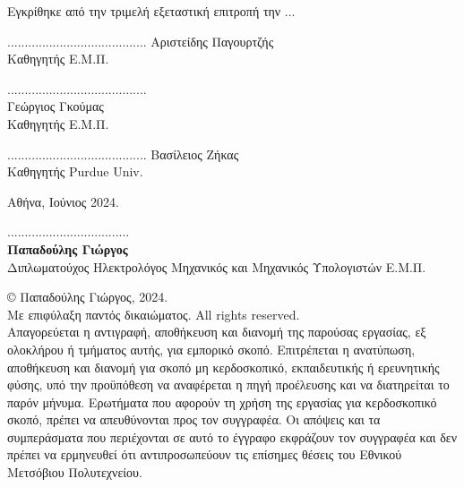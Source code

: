 \noindent
Εγκρίθηκε από την τριμελή εξεταστική επιτροπή την ...
\vspace{10ex}
\begin{center}
\scriptsize
\parbox[b]{0.3\textwidth} {\center
	........................................
	Αριστείδης Παγουρτζής \\
	Καθηγητής Ε.Μ.Π.
}
\parbox[b]{0.3\textwidth} {\center
	........................................\\
	Γεώργιος Γκούμας \\
	Καθηγητής Ε.Μ.Π.
}
\parbox[b]{0.3\textwidth} {\center
	........................................
	Βασίλειος Ζήκας \\
	Καθηγητής Purdue Univ.
}

\vspace{20ex}
\normalsize
\noindent
Αθήνα, Ιούνιος 2024.
\newpage
\end{center}
\hspace{10pt}

\vspace{30ex}
\noindent
................................... \\
\textbf{Παπαδούλης Γιώργος} \\
Διπλωματούχος Ηλεκτρολόγος Μηχανικός και Μηχανικός Υπολογιστών Ε.Μ.Π. \\
\vspace{40ex}

\small
\noindent
\copyright \hspace{1em} Παπαδούλης Γιώργος, 2024. \\
Με επιφύλαξη παντός δικαιώματος. All rights reserved. \\
Απαγορεύεται η αντιγραφή, αποθήκευση και διανομή της παρούσας εργασίας, εξ ολοκλήρου ή τμήματος
αυτής, για εμπορικό σκοπό. Επιτρέπεται η ανατύπωση, αποθήκευση και διανομή για σκοπό μη κερδοσκοπικό,
εκπαιδευτικής ή ερευνητικής φύσης, υπό την προϋπόθεση να αναφέρεται η πηγή προέλευσης και να διατηρείται το παρόν μήνυμα. Ερωτήματα που αφορούν τη χρήση της εργασίας για κερδοσκοπικό σκοπό, πρέπει να
απευθύνονται προς τον συγγραφέα.
Οι απόψεις και τα συμπεράσματα που περιέχονται σε αυτό το έγγραφο εκφράζουν τον συγγραφέα και δεν
πρέπει να ερμηνευθεί ότι αντιπροσωπεύουν τις επίσημες θέσεις του Εθνικού Μετσόβιου Πολυτεχνείου.

            

